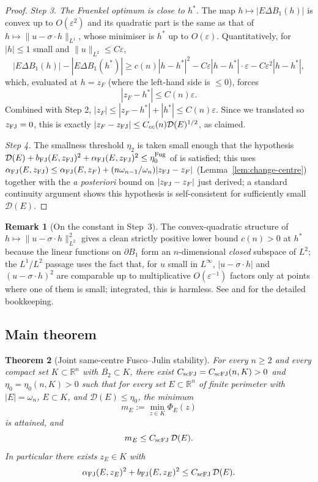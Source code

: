 \documentclass[11pt]{article}
\newtheorem{theorem}{Theorem}[section]
\theoremstyle{definition}
\newtheorem{remark}[theorem]{Remark}
\newcommand{\R}{\mathbb{R}}
\newcommand{\dD}{\mathcal D}
\newcommand{\alphaFJ}{\alpha_{\rm FJ}}
\newcommand{\bFJ}{b_{\rm FJ}}
\newcommand{\scFJ}{{\rm scFJ}}
\newcommand{\eps}{\varepsilon}
\begin{document}
\begin{proof}
\smallskip\emph{Step 3.  The Fraenkel optimum is close to
\(h^{\ast}\).}  The map \(h\mapsto|E\Delta B_1(h)|\) is convex up to
\(O(\eps^{2})\) and its quadratic part is the same as that of
\(h\mapsto\|u-\sigma\cdot h\|_{L^{1}}\), whose minimiser is
\(h^{\ast}\) up to \(O(\eps)\).  Quantitatively, for \(|h|\le1\) small
and \(\|u\|_{L^{2}}\le C\eps\),
\[
   |E\Delta B_1(h)|-|E\Delta B_1(h^{\ast})|
   \ge c(n)|h-h^{\ast}|^{2}-C\eps|h-h^{\ast}|\cdot\eps
   - C\eps^{2}|h-h^{\ast}|,
\]
which, evaluated at \(h=z_F\) (where the left-hand side is \(\le0\)),
forces
\[
   |z_F-h^{\ast}|\le C(n)\eps.
\]
Combined with Step 2, \(|z_F|\le|z_F-h^{\ast}|+|h^{\ast}|\le
C(n)\eps\).  Since we translated so \(z_{\rm FJ}=0\), this is exactly
\(|z_F-z_{\rm FJ}|\le C_{cc}(n)\dD(E)^{1/2}\), as claimed.

\smallskip\emph{Step 4.}  The smallness threshold \(\eta_{2}\) is taken
small enough that the hypothesis
\(\dD(E)+\bFJ(E,z_{\rm FJ})^{2}+\alphaFJ(E,z_{\rm FJ})^{2}\le
\eta_{0}^{\rm Fug}\) of \cite[Thm.~3.4]{CicaleseLeonardi2012} is
satisfied; this uses
\(\alphaFJ(E,z_{\rm FJ})\le\alphaFJ(E,z_F)+
(n\omega_{n-1}/\omega_n)|z_{\rm FJ}-z_F|\) (Lemma~\ref{lem:change-centre})
together with the \emph{a posteriori} bound on \(|z_{\rm FJ}-z_F|\)
just derived; a standard continuity argument shows this hypothesis is
self-consistent for sufficiently small \(\dD(E)\).
\end{proof}

\begin{remark}[On the constant in Step~3]\label{rem:step3}
The convex-quadratic structure of \(h\mapsto\|u-\sigma\cdot h\|_{L^{2}}^{2}\)
gives a clean strictly positive lower bound \(c(n)>0\) at \(h^{\ast}\)
because the linear functions on \(\partial B_1\) form an
\(n\)-dimensional \emph{closed} subspace of \(L^{2}\); the
\(L^{1}\)/\(L^{2}\) passage uses the fact that, for \(u\) small in
\(L^{\infty}\), \(|u-\sigma\cdot h|\) and \((u-\sigma\cdot h)^{2}\) are
comparable up to multiplicative \(O(\eps^{-1})\) factors only at
points where one of them is small; integrated, this is harmless.  See
\cite[Sec.~2--3]{FuscoJulin2014} and \cite[Sec.~3]{CicaleseLeonardi2012}
for the detailed bookkeeping.
\end{remark}

\subsection{Main theorem}

\begin{theorem}[Joint same-centre Fusco--Julin stability]
\label{thm:main-joint}
For every \(n\ge2\) and every compact set \(K\subset\R^{n}\) with
\(\overline{B_{2}}\subset K\), there exist
\(C_{\scFJ}=C_{\scFJ}(n,K)>0\) and \(\eta_{0}=\eta_{0}(n,K)>0\) such
that for every set \(E\subset\R^{n}\) of finite perimeter with
\(|E|=\omega_n\), \(E\subset K\), and \(\dD(E)\le\eta_{0}\), the
minimum
\[
   m_E:=\min_{z\in K}\Phi_E(z)
\]
is attained, and
\[
   m_E\le C_{\scFJ}\,\dD(E).
\]
In particular there exists \(z_E\in K\) with
\[
   \alphaFJ(E,z_E)^{2}+\bFJ(E,z_E)^{2}\le C_{\scFJ}\,\dD(E).
\]
\end{theorem}
\end{document}
